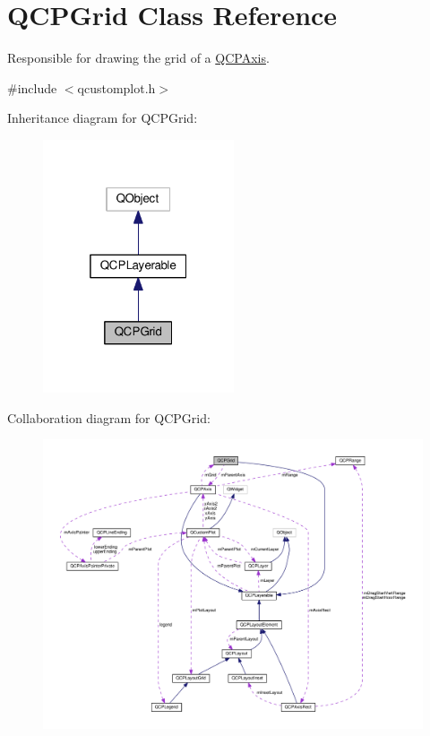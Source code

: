 \hypertarget{classQCPGrid}{}\section{Q\+C\+P\+Grid Class Reference}
\label{classQCPGrid}


Responsible for drawing the grid of a \hyperlink{classQCPAxis}{Q\+C\+P\+Axis}.  




{\ttfamily \#include $<$qcustomplot.\+h$>$}



Inheritance diagram for Q\+C\+P\+Grid\+:\nopagebreak
\begin{figure}[H]
\begin{center}
\leavevmode
\includegraphics[width=160pt]{classQCPGrid__inherit__graph}
\end{center}
\end{figure}


Collaboration diagram for Q\+C\+P\+Grid\+:\nopagebreak
\begin{figure}[H]
\begin{center}
\leavevmode
\includegraphics[width=350pt]{classQCPGrid__coll__graph}
\end{center}
\end{figure}
